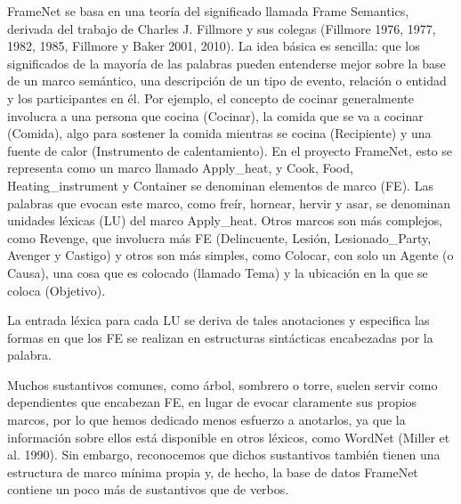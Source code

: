 FrameNet se basa en una teoría del significado llamada Frame Semantics, derivada del trabajo de Charles J. Fillmore y sus colegas (Fillmore 1976, 1977, 1982, 1985, Fillmore y Baker 2001, 2010). La idea básica es sencilla: que los significados de la mayoría de las palabras pueden entenderse mejor sobre la base de un marco semántico, una descripción de un tipo de evento, relación o entidad y los participantes en él. Por ejemplo, el concepto de cocinar generalmente involucra a una persona que cocina (Cocinar), la comida que se va a cocinar (Comida), algo para sostener la comida mientras se cocina (Recipiente) y una fuente de calor (Instrumento de calentamiento). En el proyecto FrameNet, esto se representa como un marco llamado Apply\_heat, y Cook, Food, Heating\_instrument y Container se denominan elementos de marco (FE). Las palabras que evocan este marco, como freír, hornear, hervir y asar, se denominan unidades léxicas (LU) del marco Apply\_heat. Otros marcos son más complejos, como Revenge, que involucra más FE (Delincuente, Lesión, Lesionado\_Party, Avenger y Castigo) y otros son más simples, como Colocar, con solo un Agente (o Causa), una cosa que es colocado (llamado Tema) y la ubicación en la que se coloca (Objetivo).

La entrada léxica para cada LU se deriva de tales anotaciones y especifica las formas en que los FE se realizan en estructuras sintácticas encabezadas por la palabra.

Muchos sustantivos comunes, como árbol, sombrero o torre, suelen servir como dependientes que encabezan FE, en lugar de evocar claramente sus propios marcos, por lo que hemos dedicado menos esfuerzo a anotarlos, ya que la información sobre ellos está disponible en otros léxicos, como WordNet (Miller et al. 1990). Sin embargo, reconocemos que dichos sustantivos también tienen una estructura de marco mínima propia y, de hecho, la base de datos FrameNet contiene un poco más de sustantivos que de verbos.

